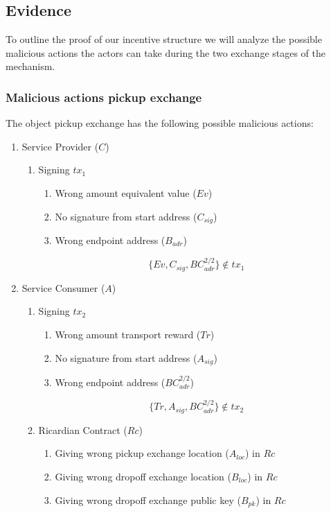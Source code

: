 \subsection{Evidence}

To outline the proof of our incentive structure we will analyze the possible malicious actions the actors can take during the two exchange stages of the mechanism.

\subsubsection{Malicious actions pickup exchange}

The object pickup exchange has the following possible malicious actions:
\begin{enumerate}
  \item Service Provider ($C$)
  \begin{enumerate}
    \item Signing $tx_1$
    \begin{enumerate}
      \item Wrong amount equivalent value ($Ev$)
      \item No signature from start address ($C_{sig}$)
      \item Wrong endpoint address ($B_{adr}$)
    \end{enumerate}
    \[\{Ev, C_{sig}, BC_{adr}^{2/2}\}\not\in tx_1\]
  \end{enumerate}
  \item Service Consumer ($A$)
  \begin{enumerate}
    \item Signing $tx_2$
    \begin{enumerate}
      \item Wrong amount transport reward ($Tr$)
      \item No signature from start address ($A_{sig}$)
      \item Wrong endpoint address ($BC_{adr}^{2/2}$)
    \end{enumerate}
    \[\{Tr, A_{sig}, BC_{adr}^{2/2}\}\not\in tx_2\]
    \item Ricardian Contract ($Rc$)
    \begin{enumerate}
      \item Giving wrong pickup exchange location ($A_{loc}$) in $Rc$
      \item Giving wrong dropoff exchange location ($B_{loc}$) in $Rc$
      \item Giving wrong dropoff exchange public key ($B_{pk}$) in $Rc$

\end{enumerate}
\end{enumerate}
\end{enumerate}
